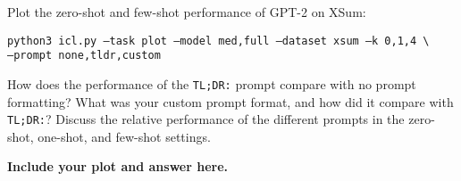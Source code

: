 \documentclass[12pt]{article}
\begin{document}
\begin{enumerate}
    Plot the zero-shot and few-shot performance of GPT-2 on XSum:
    
    \texttt{\small python3 icl.py --task plot --model med,full --dataset xsum --k 0,1,4 \textbackslash \\
    \phantom{asdf}--prompt none,tldr,custom}
    
    How does the performance of the \texttt{TL;DR:} prompt compare with no prompt formatting? What was your custom prompt format, and how did it compare with \texttt{TL;DR:}? Discuss the relative performance of the different prompts in the zero-shot, one-shot, and few-shot settings.
    
    \textbf{\color{red}Include your plot and answer here.}

\end{enumerate}
\end{document}

